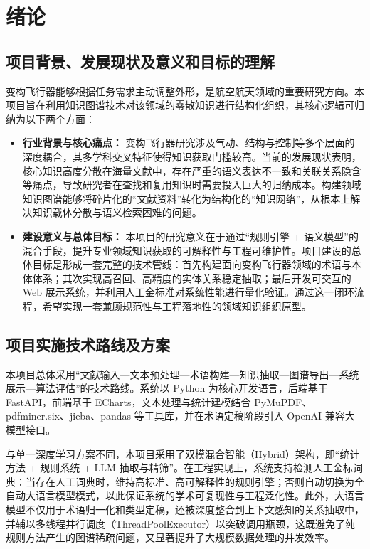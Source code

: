 \section{绪论}
\subsection{项目背景、发展现状及意义和目标的理解}
变构飞行器能够根据任务需求主动调整外形，是航空航天领域的重要研究方向。本项目旨在利用知识图谱技术对该领域的零散知识进行结构化组织，其核心逻辑可归纳为以下两个方面：

\begin{itemize}[leftmargin=2em, label=\textbullet]
    \item \textbf{行业背景与核心痛点：} 变构飞行器研究涉及气动、结构与控制等多个层面的深度耦合，其多学科交叉特征使得知识获取门槛较高。当前的发展现状表明，核心知识高度分散在海量文献中，存在严重的语义表达不一致和关联关系隐含等痛点，导致研究者在查找和复用知识时需要投入巨大的归纳成本。构建领域知识图谱能够将碎片化的“文献资料”转化为结构化的“知识网络”，从根本上解决知识载体分散与语义检索困难的问题。

    \item \textbf{建设意义与总体目标：} 本项目的研究意义在于通过“规则引擎 + 语义模型”的混合手段，提升专业领域知识获取的可解释性与工程可维护性。项目建设的总体目标是形成一套完整的技术管线：首先构建面向变构飞行器领域的术语与本体体系；其次实现高召回、高精度的实体关系稳定抽取；最后开发可交互的 Web 展示系统，并利用人工金标准对系统性能进行量化验证。通过这一闭环流程，希望实现一套兼顾规范性与工程落地性的领域知识组织原型。
\end{itemize}

\subsection{项目实施技术路线及方案}
本项目总体采用“文献输入—文本预处理—术语构建—知识抽取—图谱导出—系统展示—算法评估”的技术路线。系统以 Python 为核心开发语言，后端基于 FastAPI，前端基于 ECharts，文本处理与统计建模结合 PyMuPDF、pdfminer.six、jieba、pandas 等工具库，并在术语定稿阶段引入 OpenAI 兼容大模型接口。

与单一深度学习方案不同，本项目采用了双模混合智能（Hybrid）架构，即“统计方法 + 规则系统 + LLM 抽取与精筛”。在工程实现上，系统支持检测人工金标词典：当存在人工词典时，维持高标准、高可解释性的规则引擎；否则自动切换为全自动大语言模型模式，以此保证系统的学术可复现性与工程泛化性。此外，大语言模型不仅用于术语归一化和类型定稿，还被深度整合到上下文感知的关系抽取中，并辅以多线程并行调度（ThreadPoolExecutor）以突破调用瓶颈，这既避免了纯规则方法产生的图谱稀疏问题，又显著提升了大规模数据处理的并发效率。

